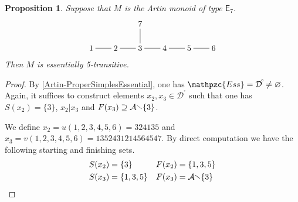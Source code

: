 \documentclass[a4paper,final]{article}
\let\emptyset\varnothing
\theoremstyle{plain}
\newtheorem{proposition}[proposition]{Proposition}
\theoremstyle{remark}
\theoremstyle{definition}
\begin{document}
\begin{proposition}
  Suppose that $M$ is the Artin monoid of type ${\mathsf{{E}}}_7$.
  \[
    \begin{xy}
      0;<3em,0em>:<0em,3em>::
      
      (0,0)*+{1}="1";
      (1,0)*+{2}="2";
      (2,0)*+{3}="3";
      (3,0)*+{4}="4";
      (4,0)*+{5}="5";
      (5,0)*+{6}="6";
      (2,1)*+{7}="7";
      
      {\ar@{-}     "1";"2"};
      {\ar@{-}     "2";"3"};
      {\ar@{-}     "3";"4"};
      {\ar@{-}     "4";"5"};
      {\ar@{-}     "5";"6"};
      {\ar@{-}     "3";"7"};
    \end{xy}
  \]
  Then $M$ is essentially 5-transitive.
\end{proposition}
\begin{proof}
  By \autoref{Artin-ProperSimplesEssential}, one has ${\mathpzc{Ess}}={{\mathcal{D}}^{\!{}^{\circ}\!}}\neq\emptyset$.
  Again, it suffices to construct elements $x_2, x_3 \in {{\mathcal{D}}^{\!{}^{\circ}\!}}$
  such that one has ${S}(x_2) = \{3\}$, $x_2 | x_3$ and ${F}(x_3) \supseteq {\mathcal{A}}
  {\mathbin{\raisebox{0.25ex}{$\smallsetminus$}}} \{3\}$.
  
  We define $x_2 = u(1,2,3,4,5,6) = 324135$ and $x_3 = v(1,2,3,4,5,6) = 135243 121 456454 7$.
  By direct computation we have the following starting and finishing sets.
  \begin{align*}
    {S}(x_2) &= \{ 3 \} &
    {F}(x_2) &= \{ 1, 3, 5 \} \\
    {S}(x_3) &= \{ 1, 3, 5 \} &
    {F}(x_3) &= {\mathcal{A}}{\mathbin{\raisebox{0.25ex}{$\smallsetminus$}}}\{ 3 \}
  \end{align*}
\end{proof}
\end{document}

